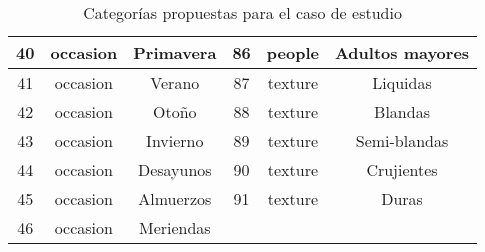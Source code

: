 \begin{table}
\begin{center}
\begin{tabular}{ | c | c | c | c | c | c |}
        \midrule
        40 & occasion  & Primavera & 86 & people  & Adultos mayores \\
        \midrule
        41 & occasion  & Verano & 87 & texture  & Liquidas \\
        \midrule
        42 & occasion  & Otoño & 88 & texture  & Blandas \\
        \midrule
        43 & occasion  & Invierno & 89 & texture  & Semi-blandas \\
        \midrule
        44 & occasion  & Desayunos & 90 & texture  & Crujientes \\
        \midrule
        45 & occasion  & Almuerzos & 91 & texture  & Duras \\
        \midrule
        46 & occasion  & Meriendas & & & \\
        \bottomrule
      \end{tabular}
      \caption{Categorías propuestas para el caso de estudio}
      \label{Categorías propuestas para el caso de estudio}
    \end{center}
  \end{table}